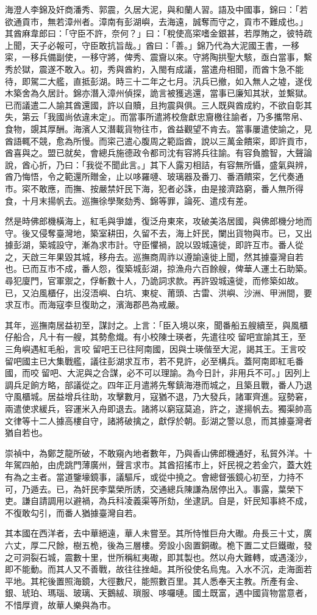 \begin{pinyinscope}
海澄人李錦及奸商潘秀、郭震，久居大泥，與和蘭人習。語及中國事，錦曰：「若欲通貢市，無若漳州者。漳南有彭湖嶼，去海遠，誠奪而守之，貢市不難成也。」其酋麻韋郎曰：「守臣不許，奈何？」曰：「稅使高寀嗜金銀甚，若厚賄之，彼特疏上聞，天子必報可，守臣敢抗旨哉。」酋曰：「善。」錦乃代為大泥國王書，一移寀，一移兵備副使，一移守將，俾秀、震齎以來。守將陶拱聖大駭，亟白當事，繫秀於獄，震遂不敢入。初，秀與酋約，入閩有成議，當遣舟相聞，而酋卞急不能待，即駕二大艦，直抵彭湖。時三十二年之七月。汛兵已撤，如入無人之墟，遂伐木築舍為久居計。錦亦潛入漳州偵探，詭言被獲逃還，當事已廉知其狀，並繫獄。已而議遣二人諭其酋還國，許以自贖，且拘震與俱。三人既與酋成約，不欲自彰其失，第云「我國尚依違未定」。而當事所遣將校詹獻忠齎檄往諭者，乃多攜幣帛、食物，覬其厚酬。海濱人又潛載貨物往市，酋益觀望不肯去。當事屢遣使諭之，見酋語輒不競，愈為所慢。而寀己遣心腹周之範詣酋，說以三萬金饋寀，即許貢市，酋喜與之。盟已就矣，會總兵施德政令都司沈有容將兵往諭。有容負膽智，大聲論說，酋心折，乃曰：「我從不聞此言。」其下人露刃相詰，有容無所懾，盛氣與辨，酋乃悔悟，令之範還所贈金，止以哆羅嗹、玻璃器及番刀、番酒饋寀，乞代奏通市。寀不敢應，而撫、按嚴禁奸民下海，犯者必誅，由是接濟路窮，番人無所得食，十月末揚帆去。巡撫徐學聚劾秀、錦等罪，論死、遣戍有差。

然是時佛郎機橫海上，紅毛與爭雄，復泛舟東來，攻破美洛居國，與佛郎機分地而守。後又侵奪臺灣地，築室耕田，久留不去，海上奸民，闌出貨物與市。已，又出據彭湖，築城設守，漸為求市計。守臣懼禍，說以毀城遠徙，即許互市。番人從之，天啟三年果毀其城，移舟去。巡撫商周祚以遵諭遠徙上聞，然其據臺灣自若也。已而互市不成，番人怨，復築城彭湖，掠漁舟六百餘艘，俾華人運土石助築。尋犯廈門，官軍禦之，俘斬數十人，乃詭詞求款。再許毀城遠徙，而修築如故。已，又泊風櫃仔，出沒浯嶼、白坑、東椗、莆頭、古雷、洪嶼、沙洲、甲洲間，要求互市。而海寇李旦復助之，濱海郡邑為戒嚴。

其年，巡撫南居益初至，謀討之。上言：「臣入境以來，聞番船五艘續至，與風櫃仔船合，凡十有一艘，其勢愈熾。有小校陳士瑛者，先遣往咬留吧宣諭其王，至三角嶼遇紅毛船，言咬留吧王已往阿南國，因與士瑛偕至大泥，謁其王。王言咬留吧國主已大集戰艦，議往彭湖求互市，若不見許，必至構兵。蓋阿南即紅毛番國，而咬留吧、大泥與之合謀，必不可以理諭。為今日計，非用兵不可。」因列上調兵足餉方略，部議從之。四年正月遣將先奪鎮海港而城之，且築且戰，番人乃退守風櫃城。居益增兵往助，攻擊數月，寇猶不退，乃大發兵，諸軍齊進。寇勢窘，兩遣使求緩兵，容運米入舟即退去。諸將以窮寇莫追，許之，遂揚帆去。獨渠帥高文律等十二人據高樓自守，諸將破擒之，獻俘於朝。彭湖之警以息，而其據臺灣者猶自若也。

崇禎中，為鄭芝龍所破，不敢窺內地者數年，乃與香山佛郎機通好，私貿外洋。十年駕四舶，由虎跳門薄廣州，聲言求市。其酋招搖市上，奸民視之若金穴，蓋大姓有為之主者。當道鑒壕鏡事，議驅斥，或從中撓之。會總督張鏡心初至，力持不可，乃遁去。已，為奸民李葉榮所誘，交通總兵陳謙為居停出入。事露，葉榮下吏。謙自請調用以避禍，為兵科凌義渠等所劾，坐逮訊。自是，奸民知事終不成，不復敢勾引，而番人猶據臺灣自若。

其本國在西洋者，去中華絕遠，華人未嘗至。其所恃惟巨舟大礮。舟長三十丈，廣六丈，厚二尺餘，樹五桅，後為三層樓。旁設小囪置銅礮。桅下置二丈巨鐵礮，發之可洞裂石城，震數十里，世所稱紅夷礮，即其製也。然以舟大難轉，或遇淺沙，即不能動。而其人又不善戰，故往往挫衄。其所役使名烏鬼。入水不沉，走海面若平地。其柁後置照海鏡，大徑數尺，能照數百里。其人悉奉天主教。所產有金、銀、琥珀、瑪瑙、玻璃、天鵝絨、瑣服、哆囉嗹。國土既富，遇中國貨物當意者，不惜厚資，故華人樂與為市。


\end{pinyinscope}